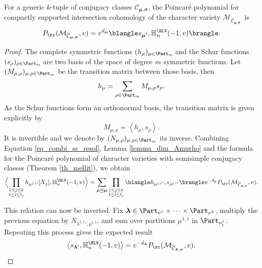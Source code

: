 \begin{theorem}\label{th_sect_poincare}
For a generic $k$-tuple of conjugacy classes ${\mathcal{C}}_{\boldsymbol{\mu},\boldsymbol{\sigma}}$, the Poincaré polynomial for compactly supported intersection cohomology of the character variety $\mathcal{M}_{\overline{\mathcal{C}}_{\boldsymbol{\mu},\boldsymbol{\sigma}}}$~is
\[
P_{\rc}(\mathcal{M}_{\overline{\mathcal{C}}_{\boldsymbol{\mu},\boldsymbol{\sigma}}},v) = v^{d_{\boldsymbol{\mu}}}\blangle s_{\boldsymbol{\mu'}}, \mathbb{H}_n^{\HLV}(-1,v)\brangle.
\]
\end{theorem}
\begin{proof}
The complete symmetric functions $(h_{\mu})_{\mu\in \Part_m}\!$ and the Schur functions $(s_{\rho})_{\rho\in\Part_m}\!$ are two basis of the space of degree $m$ symmetric functions. Let $(M_{\mu,\rho})_{\mu,\rho\in\Part_m }$ be the transition matrix between those basis, then
\[
h_{\mu} = \sum_{\rho \in\Part_m} M_{\mu,\rho} s_{\rho}.
\]
As the Schur functions form an orthonormal basis, the transition matrix is given explicitly by
\[
M_{\mu,\rho} = \left\langle h_{\mu},s_{\rho}\right\rangle.
\]
It is invertible and we denote by $(N_{\mu,\rho})_{\mu,\rho \in \Part_m }$ its inverse. Combining Equation \eqref{eq_combi_ss_resol}, Lemma \ref{lemma_dim_Amurho} and the formula for the Poincaré polynomial of character varieties with semisimple conjugacy classes (Theorem \ref{th_mellit}), we obtain
\[
\Bigl\langle \prod_{\substack{1 \le j \le k \\ 1 \le i \le l_j}} h_{ {\mu^{j,i}}'}[X_j],\mathbb{H}_n^{\HLV}(-1,v)\Bigr\rangle = \sum_{\boldsymbol{\rho\preceq\mu}} \prod_{\substack{1 \le j \le k \\ 1 \le i \le l_j}}\blangle h_{ {\mu^{ j,i}}' }, s_{ {\rho^{ j,i}}' }\brangle v^{-d_{\boldsymbol{\rho}}} P_{\rc}(\mathcal{M}_{\overline{\mathcal{C}}_{\boldsymbol{\rho},\boldsymbol{\sigma}}}, v).
\]

This relation can now be inverted. Fix $\boldsymbol{\lambda}\in \Part_{\nu^1}\times\dots\times\Part_{\nu^k}$, multiply the previous equation by $N_{{\lambda^{1,1}}',{\mu^{1,1}}'}$ and sum over partitions ${\mu^{1,1}}$ in $ \Part_{\nu^1_1}$. Repeating this process gives the expected result
\[
\left\langle s_{\boldsymbol{\lambda}'}, \mathbb{H}_n^{\HLV}(-1,v)\right\rangle = v^{-d_{\boldsymbol{\lambda}}} P_{\rc}(\mathcal{M}_{\overline{\mathcal{C}}_{\boldsymbol{\lambda},\boldsymbol{\sigma}}}, v).
\]


\end{proof}
